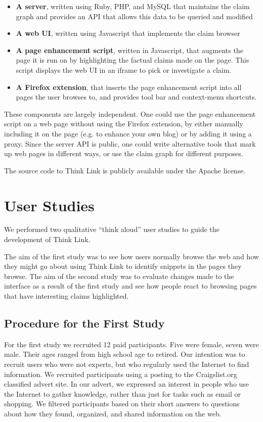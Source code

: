 \documentclass{chi2009}
\begin{document}
\begin{itemize}
\item {\bf A server}, written using Ruby, PHP, and MySQL that maintains the claim graph and provides an API that allows this data to be queried and modified
\item {\bf A web UI}, written using Javascript that implements the claim browser
\item {\bf A page enhancement script}, written in Javascript, that augments the page it is run on by highlighting the factual claims made on the page. This script displays the web UI in an iframe to pick or investigate a claim.
\item {\bf A Firefox extension}\cite{firefoxextend}, that inserts the page enhancement script into all pages the user browses to, and provides tool bar and context-menu shortcuts.
\end{itemize}

These components are largely independent. One could use the page enhancement script on a web page without using the Firefox extension, by either manually including it on the page (e.g. to enhance your own blog) or by adding it using a proxy. Since the server API is public, one could write alternative tools that mark up web pages in different ways, or use the claim graph for different purposes. 

The source code to Think Link is publicly available under the Apache license. 


\section{User Studies}

We performed two qualitative ``think aloud'' user studies to guide the development of Think Link. 

The aim of the first study was to see how users normally browse the web and how they might go about using Think Link to identify snippets in the pages they browse. The aim of the second study was to evaluate changes made to the interface as a result of the first study and see how people react to browsing pages that have interesting claims highlighted.

\subsection{Procedure for the First Study}

For the first study we recruited 12 paid participants. Five were female, seven were male. Their ages ranged from high school age to retired. Our intention was to recruit users who were not experts, but who regularly used the Internet to find information. We recruited participants using a posting to the Craigslist.org classified advert site. In our advert, we expressed an interest in people who use the Internet to gather knowledge, rather than just for tasks such as email or shopping. We filtered participants based on their short answers to questions about how they found, organized, and shared information on the web. 
\end{document}
